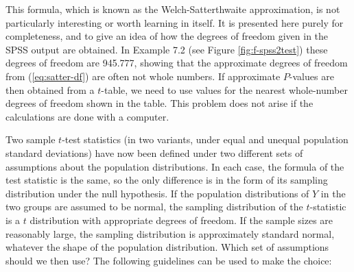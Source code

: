 \documentclass[11pt,a4paper,openany]{book}
\begin{document}
This formula, which is known as the Welch-Satterthwaite approximation,
is not particularly interesting or worth learning in itself. It is
presented here purely for completeness, and to give an idea of how the
degrees of freedom given in the SPSS output are obtained. In Example 7.2
(see Figure \ref{fig:f-spss2test}) these degrees of freedom are 945.777,
showing that the approximate degrees of freedom from
(\ref{eq:satter-df}) are often not whole numbers. If approximate
\(P\)-values are then obtained from a \(t\)-table, we need to use values
for the nearest whole-number degrees of freedom shown in the table. This
problem does not arise if the calculations are done with a computer.

Two sample \(t\)-test statistics (in two variants, under equal and
unequal population standard deviations) have now been defined under two
different sets of assumptions about the population distributions. In
each case, the formula of the test statistic is the same, so the only
difference is in the form of its sampling distribution under the null
hypothesis. If the population distributions of \(Y\) in the two groups
are assumed to be normal, the sampling distribution of the
\(t\)-statistic is a \(t\) distribution with appropriate degrees of
freedom. If the sample sizes are reasonably large, the sampling
distribution is approximately standard normal, whatever the shape of the
population distribution. Which set of assumptions should we then use?
The following guidelines can be used to make the choice:
\end{document}
